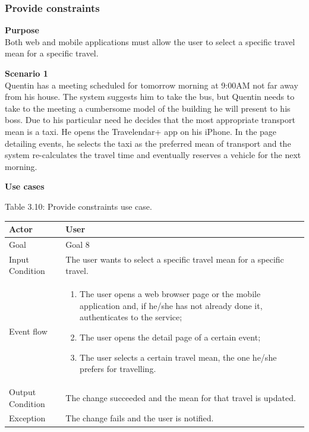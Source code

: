 \documentclass{article}
\begin{document}
	\subsubsection{Provide constraints}
	
	\bigskip
	\noindent
	\textbf{Purpose} \\
	Both web and mobile applications must allow the user to select a specific travel mean for a specific travel.
	
	\bigskip
	\noindent
	\textbf{Scenario 1} \\
	Quentin has a meeting scheduled for tomorrow morning at 9:00AM not far away from his house. The system suggests him to take the bus, but Quentin needs to take to the meeting a cumbersome model of the building he will present to his boss. Due to his particular need he decides that the most appropriate transport mean is a taxi. He opens the Travelendar+ app on his iPhone. In the page detailing events, he selects the taxi as the preferred mean of transport and the system re-calculates the travel time and eventually reserves a vehicle for the next morning.
	
	\bigskip
	\noindent
	\textbf{Use cases} \\
	
	\begin{center}
		Table 3.10: Provide constraints use case.
		
		\bigskip
  		\begin{tabular}{p{}|p{}}
   		 	\hline
    			Actor & User \\ \hline
    			Goal & Goal 8 \\ \hline
    			Input Condition & The user wants to select a specific travel mean for a specific travel. \\ \hline
    			Event flow & 
			\begin{enumerate}
  				\item The user opens a web browser page or the mobile application and, if he/she has not already done it, authenticates to the service;
  				\item The user opens the detail page of a certain event;
  				\item The user selects a certain travel mean, the one he/she prefers for travelling.
 			 \end{enumerate} \\ \hline
    			Output Condition & The change succeeded and the mean for that travel is updated. \\ \hline
    			Exception & The change fails and the user is notified. \\ \hline
    		\end{tabular}
	\end{center}
	
\end{document}
